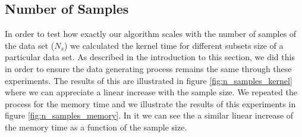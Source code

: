 \documentclass[11pt,a4paper]{article}
\begin{document}
\subsection{Number of Samples}

In order to test how exactly our algorithm scales with the number of samples 
of the data set ($N_s$) we calculated the kernel time for different subsets 
size of a particular data set. As described in the introduction to this section, we did
this in order to ensure the data generating process remains the same through these
experiments. The results of this are illustrated in figure \ref{fig:n_samples_kernel} where we can appreciate
a linear increase with the sample size. We repeated the process for 
the memory time and we illustrate the results of this experiments 
in figure \ref{fig:n_samples_memory}. In it we can see
the a similar linear increase of the memory time as a function of the sample size. 
\end{document}
